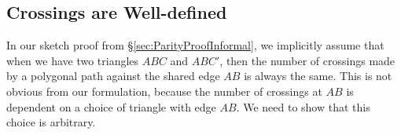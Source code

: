 



\subsection{Crossings are Well-defined}\label{sec:CrossingsWellDefined}
In our sketch proof from \S\ref{sec:ParityProofInformal}, we implicitly assume that when we have two triangles $ABC$ and $ABC'$, then the number of crossings made by a polygonal path against the shared edge $AB$ is always the same. This is not obvious from our formulation, because the number of crossings at $AB$ is dependent on a choice of triangle with edge $AB$. We need to show that this choice is arbitrary.

